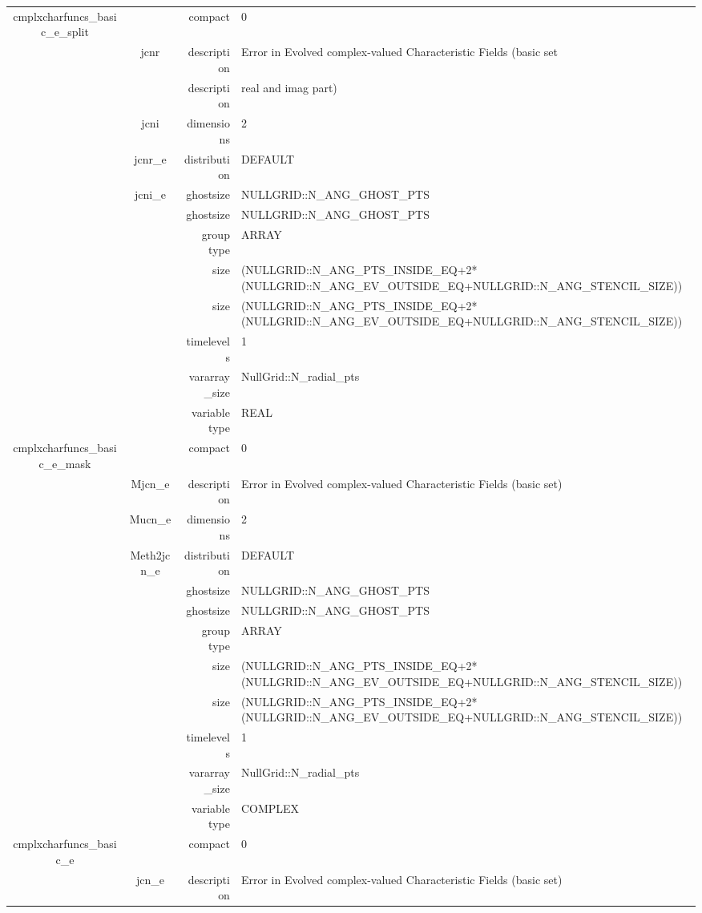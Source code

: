 \begin{tabular*}{150mm}{|c|c@{\extracolsep{\fill}}|rl|}
cmplxcharfuncs\_basic\_e\_split &  & compact & 0 \\ 
 & jcnr & description & Error in Evolved complex-valued Characteristic Fields (basic set \\ 
& ~ & description &  real and imag part) \\ 
 & jcni & dimensions & 2 \\ 
 & jcnr\_e & distribution & DEFAULT \\ 
 & jcni\_e & ghostsize & NULLGRID::N\_ANG\_GHOST\_PTS \\ 
& ~ & ghostsize & NULLGRID::N\_ANG\_GHOST\_PTS \\ 
 &  & group type & ARRAY \\ 
 &  & size & (NULLGRID::N\_ANG\_PTS\_INSIDE\_EQ+2*(NULLGRID::N\_ANG\_EV\_OUTSIDE\_EQ+NULLGRID::N\_ANG\_STENCIL\_SIZE)) \\ 
& ~ & size & (NULLGRID::N\_ANG\_PTS\_INSIDE\_EQ+2*(NULLGRID::N\_ANG\_EV\_OUTSIDE\_EQ+NULLGRID::N\_ANG\_STENCIL\_SIZE)) \\ 
 &  & timelevels & 1 \\ 
 &  & vararray\_size & NullGrid::N\_radial\_pts \\ 
 &  & variable type & REAL \\ 
\hline 
cmplxcharfuncs\_basic\_e\_mask &  & compact & 0 \\ 
 & Mjcn\_e & description & Error in Evolved complex-valued Characteristic Fields (basic set) \\ 
 & Mucn\_e & dimensions & 2 \\ 
 & Meth2jcn\_e & distribution & DEFAULT \\ 
 &  & ghostsize & NULLGRID::N\_ANG\_GHOST\_PTS \\ 
& ~ & ghostsize & NULLGRID::N\_ANG\_GHOST\_PTS \\ 
 &  & group type & ARRAY \\ 
 &  & size & (NULLGRID::N\_ANG\_PTS\_INSIDE\_EQ+2*(NULLGRID::N\_ANG\_EV\_OUTSIDE\_EQ+NULLGRID::N\_ANG\_STENCIL\_SIZE)) \\ 
& ~ & size & (NULLGRID::N\_ANG\_PTS\_INSIDE\_EQ+2*(NULLGRID::N\_ANG\_EV\_OUTSIDE\_EQ+NULLGRID::N\_ANG\_STENCIL\_SIZE)) \\ 
 &  & timelevels & 1 \\ 
 &  & vararray\_size & NullGrid::N\_radial\_pts \\ 
 &  & variable type & COMPLEX \\ 
\hline 
cmplxcharfuncs\_basic\_e &  & compact & 0 \\ 
 & jcn\_e & description & Error in Evolved complex-valued Characteristic Fields (basic set) \\ 

\end{tabular*}
